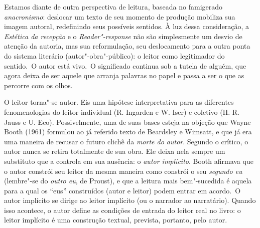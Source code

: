 Estamos diante de outra perspectiva de leitura, baseada no famigerado
\emph{anacronismo}: deslocar um texto de seu momento de produção
mobiliza sua imagem autoral, redefinindo seus possíveis sentidos. À luz
dessa consideração, a \emph{Estética da recepção} e
o \emph{Reader"-response} não são simplesmente um desvio de atenção da
autoria, mas sua reformulação, seu deslocamento para a outra ponta do
sistema literário (autor"-obra"-público): o leitor como legitimador do
sentido.~O autor está vivo.~O significado continua sob a tutela de
alguém, que agora deixa de ser aquele que arranja palavras no papel e
passa a ser o que as percorre com os olhos.

O leitor torna"-se autor. Eis uma hipótese interpretativa para as
diferentes fenomenologias do leitor individual (R. Ingarden e W. Iser) e
coletivo (H. R. Jauss e U. Eco). Possivelmente, uma de suas bases esteja
na objeção que Wayne Booth (1961) formulou ao já referido texto de
Beardsley e Wimsatt, e que já era uma maneira de recusar o futuro clichê
da \emph{morte do autor}. Segundo o crítico, o autor nunca se retira
totalmente de sua obra. Ele deixa nela sempre um substituto que a
controla em sua ausência: o \emph{autor implícito}. Booth afirmava que o
autor constrói seu leitor da mesma maneira como constrói o
seu \emph{segundo eu} (lembre"-se do \emph{outro eu}, de Proust), e que a
leitura mais bem"-sucedida é aquela para a qual os ``eus'' construídos
(autor e leitor) podem entrar em acordo.~O autor implícito se dirige ao
leitor implícito (ou o narrador ao narratário). Quando isso acontece, o
autor define as condições de entrada do leitor real no livro: o leitor
implícito é uma construção textual, prevista, portanto, pelo autor.

